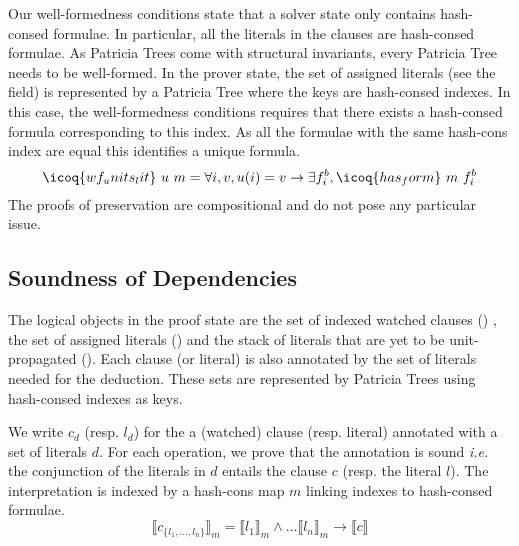 \documentclass[utf8,a4paper,UKenglish,cleveref, autoref, thm-restate]{lipics-v2019}
\begin{document}
Our well-formedness conditions state that a solver state
 only contains hash-consed formulae. In particular, all
the literals in the clauses are hash-consed formulae.
%
As Patricia Trees come with structural invariants, every Patricia Tree needs to be well-formed. 
%
In the prover state, the set of assigned literals (see the
 field) is represented by a Patricia Tree  where the keys are hash-consed indexes.  In this
case, the well-formedness conditions requires that there exists a
hash-consed formula corresponding to this index.  As all the formulae
with the same hash-cons index are equal this identifies a unique
formula.
\[
  \icoq{wf_units_lit}\ u\ m = \forall i,v, u(i) = v \to \exists f_i^b, \icoq{has_form}\ m\ f_i^b
\]
The proofs of preservation are compositional and do not pose any particular issue.

\subsection{Soundness of Dependencies}

The logical objects in the proof state are the set of indexed watched
clauses () , the set of assigned literals ()
and the stack of literals that are yet to be unit-propagated
(). Each clause (or literal) is also
annotated by the set of literals needed for the deduction.
%
These sets are represented by Patricia Trees using hash-consed indexes as keys.

We write $c_d$ (resp. $l_d$) for the a (watched) clause
(resp. literal) annotated with a set of literals $d$. For each
operation, we prove that the annotation is sound \emph{i.e.}
the conjunction of the literals in $d$ entails the clause $c$ (resp. the literal $l$).
The interpretation is indexed by a hash-cons map $m$ linking indexes to hash-consed formulae.
\[
  \llbracket c_{\{l_1,\dots,l_n\}} \rrbracket_m = \llbracket l_1
  \rrbracket_m \land \dots \llbracket l_n \rrbracket_m \rightarrow
  \llbracket c \rrbracket
\]
\end{document}
